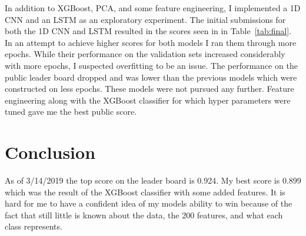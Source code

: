 \documentclass[11pt,letterpaper]{article}
\begin{document}
\begin{table}[h!]
\centering
\caption{Final public results}
\label{tab:final}
\end{table}

In addition to XGBoost, PCA, and some feature engineering, I implemented a 1D CNN
and an LSTM as an exploratory experiment.  The initial submissions for both the
1D CNN and LSTM resulted in the scores seen in in Table~\ref{tab:final}.  In an
attempt to achieve higher scores for both models I ran them through more epochs.
While their performance on the validation sets increased considerably with more
epochs, I suspected overfitting to be an issue.  The performance on the public
leader board dropped and was lower than the previous models which were
constructed on less epochs.  These models were not pursued any further.  Feature
engineering along with the XGBoost classifier for which hyper parameters were
tuned gave me the best public score.

\section{Conclusion}

As of 3/14/2019 the top score on the leader board is 0.924.  My best score is
0.899 which was the result of the XGBoost classifier with some added features.
It is hard for me to have a confident idea of my models ability to win because
of the fact that still little is known about the data, the 200 features, and
what each class represents.%
\end{document}
